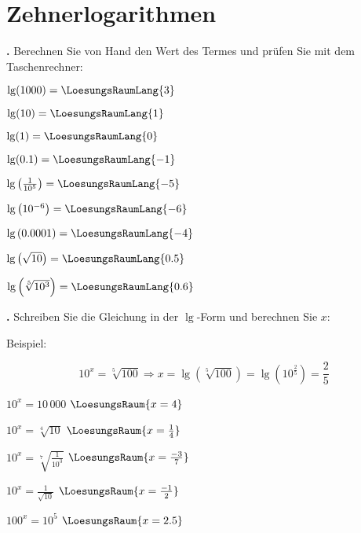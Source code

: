 
\renewcommand{\bbwAufgabenBlockID}{A2Log}

\renewcommand{\metaHeaderLine}{Logarithmen}
\renewcommand{\arbeitsblattTitel}{Algebra: Logarithmen}


\arbeitsblattHeader{}

\section{Zehnerlogarithmen}

\textbf{\bbwAufgabenNummer{}.}
Berechnen Sie von Hand den Wert des Termes und prüfen Sie mit dem Taschenrechner:

\begin{bbwAufgabenBlock}
\item $\lg(1000) = \LoesungsRaumLang{3}$
\item $\lg(10) = \LoesungsRaumLang{1}$
\item $\lg(1) = \LoesungsRaumLang{0}$
\item $\lg(0.1) = \LoesungsRaumLang{-1}$
\item $\lg\left(\frac1{10^5}\right) = \LoesungsRaumLang{-5}$
\item $\lg\left(10^{-6}\right) = \LoesungsRaumLang{-6}$
\item $\lg\left(0.0001\right) = \LoesungsRaumLang{-4}$
\item $\lg\left(\sqrt{10}\right) = \LoesungsRaumLang{0.5}$
\item $\lg\left(\sqrt[5]{10^3}\right) = \LoesungsRaumLang{0.6}$
\end{bbwAufgabenBlock}

\newpage


\textbf{\bbwAufgabenNummer{}.}
Schreiben Sie die Gleichung in der $\lg$-Form und berechnen Sie $x$:

Beispiel:

$$10^x=\sqrt[5]{100} \Longrightarrow   x=\lg\left(\sqrt[5]{100}\right)
= \lg\left(10^{\frac25}\right) = \frac25$$

\begin{bbwAufgabenBlock}
\item $10^x = 10\,000$ $\LoesungsRaum{x=4}$
\item $10^x = \sqrt[4]{10}$ $\LoesungsRaum{x=\frac14}$
\item $10^x = \sqrt[7]{\frac1{10^3}}$ $\LoesungsRaum{x=\frac{-3}{7}}$
\item $10^x = \frac{1}{\sqrt{10}}$ $\LoesungsRaum{x=\frac{-1}2}$
\item $100^x = 10^5$ $\LoesungsRaum{x=2.5}$
\end{bbwAufgabenBlock}

